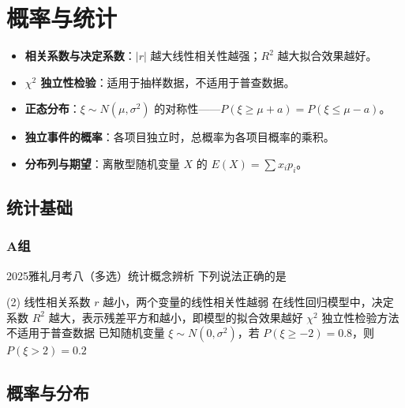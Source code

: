 \chapter{概率与统计}
\setcounter{choicecounter}{0}

\begin{knowledgeframe}
\begin{itemize}
	\item \textbf{相关系数与决定系数}：$|r|$ 越大线性相关性越强；$R^2$ 越大拟合效果越好。
	\item \textbf{$\chi^2$ 独立性检验}：适用于抽样数据，不适用于普查数据。
	\item \textbf{正态分布}：$\xi \sim N(\mu, \sigma^2)$ 的对称性——$P(\xi \ge \mu+a)=P(\xi \le \mu-a)$。
	\item \textbf{独立事件的概率}：各项目独立时，总概率为各项目概率的乘积。
	\item \textbf{分布列与期望}：离散型随机变量 $X$ 的 $E(X)=\sum x_i p_i$。
\end{itemize}
\end{knowledgeframe}

\section{统计基础}

\startexercise

\subsection*{A组}

\begin{choice}{2025雅礼月考八（多选）}{统计概念辨析}
	下列说法正确的是
	\begin{tasks}(2)
		\task 线性相关系数 $r$ 越小，两个变量的线性相关性越弱
		\task 在线性回归模型中，决定系数 $R^2$ 越大，表示残差平方和越小，即模型的拟合效果越好
		\task $\chi^2$ 独立性检验方法不适用于普查数据
		\task 已知随机变量 $\xi \sim N(0, \sigma^2)$，若 $P(\xi \ge -2) = 0.8$，则 $P(\xi > 2) = 0.2$
	\end{tasks}
\end{choice}

\stopexercise

\section{概率与分布}

